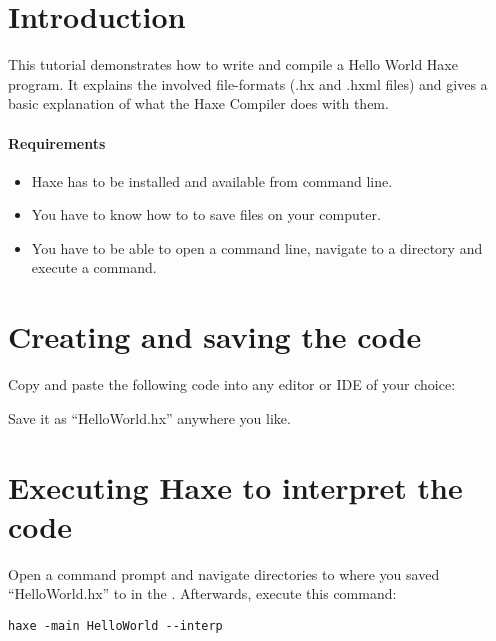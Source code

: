 \label{hello-world}

\subtoc

\section*{Introduction}
\label{hello-world-introduction}

This tutorial demonstrates how to write and compile a Hello World Haxe program. It explains the involved file-formats (.hx and .hxml files) and gives a basic explanation of what the Haxe Compiler does with them.

\paragraph{Requirements}

\begin{itemize}
	\item Haxe has to be installed and available from command line.
	\item You have to know how to to save files on your computer.
	\item You have to be able to open a command line, navigate to a directory and execute a command.
\end{itemize}

\section*{Creating and saving the code}
\label{hello-world-code}

Copy and paste the following code into any editor or IDE of your choice:


Save it as ``HelloWorld.hx'' anywhere you like.

\section*{Executing Haxe to interpret the code}
\label{hello-world-executing}

Open a command prompt and navigate directories to where you saved ``HelloWorld.hx'' to in the . Afterwards, execute this command:

\begin{lstlisting}
haxe -main HelloWorld --interp
\end{lstlisting}